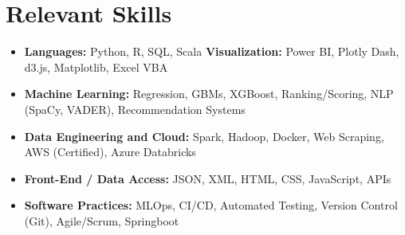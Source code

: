 \documentclass[letterpaper,11pt]{article}
\begin{document}
\vspace{-15pt}







\section{Relevant Skills}
\begin{itemize}[leftmargin=0.00in, label={}, itemsep=1px, parsep=0pt]






\item{

{\textbf{Languages:} Python, R, SQL, Scala}\hspace{0.5cm}
\small{\textbf{Visualization:} Power BI, Plotly Dash, d3.js, Matplotlib, Excel VBA}
}

\item{
{\textbf{Machine Learning:} Regression, GBMs, XGBoost, Ranking/Scoring, NLP (SpaCy, VADER), Recommendation Systems
}}



\item{
\small{\textbf{Data Engineering and Cloud:} Spark, Hadoop, Docker, Web Scraping, AWS (Certified), Azure Databricks}}


\item{
{\textbf{Front-End / Data Access:} JSON, XML, HTML, CSS, JavaScript, APIs}
}

\item{
{\textbf{Software Practices:} MLOps, CI/CD, Automated Testing, Version Control (Git), Agile/Scrum, Springboot}
}













\end{itemize}
\vspace{-18pt}
\end{document}

